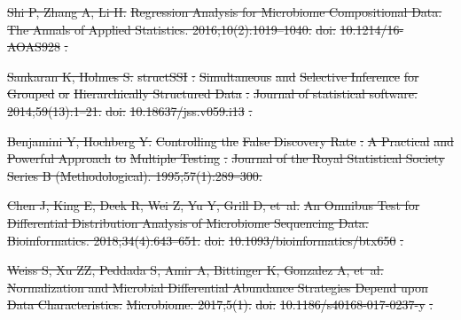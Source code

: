 \documentclass[10pt,letterpaper]{article}
\providecommand{\DIFdeltex}[1]{{\protect\color{red}\sout{#1}}}                      %
\providecommand{\DIFdelbegin}{} %
\providecommand{\DIFdel}[1]{\texorpdfstring{\DIFdeltex{#1}}{}} %
\newcommand{\DIFscaledelfig}{0.5}
\newlength{\DIFdelgraphicswidth} %
\newlength{\DIFdelgraphicsheight} %
\newcommand{\DIFdelincludegraphics}[2][]{%
\sbox{\DIFdelgraphicsbox}{\DIFOincludegraphics[#1]{#2}}%
\settoboxwidth{\DIFdelgraphicswidth}{\DIFdelgraphicsbox} %
\settoboxtotalheight{\DIFdelgraphicsheight}{\DIFdelgraphicsbox} %
\scalebox{\DIFscaledelfig}{%
\parbox[b]{\DIFdelgraphicswidth}{\usebox{\DIFdelgraphicsbox}\\[-\baselineskip] \rule{\DIFdelgraphicswidth}{0em}}\llap{\resizebox{\DIFdelgraphicswidth}{\DIFdelgraphicsheight}{%
\setlength{\unitlength}{\DIFdelgraphicswidth}%
\begin{picture}(1,1)%
\thicklines\linethickness{2pt} %
{\color[rgb]{1,0,0}\put(0,0){\framebox(1,1){}}}%
{\color[rgb]{1,0,0}\put(0,0){\line( 1,1){1}}}%
{\color[rgb]{1,0,0}\put(0,1){\line(1,-1){1}}}%
\end{picture}%
}\hspace*{3pt}}} %
} %
\DeclareRobustCommand{\DIFdelbegin}{\DIFOdelbegin \let\includegraphics\DIFdelincludegraphics} %
\begin{document}
\begin{thebibliography}{10}
\DIFdelbegin {}
\DIFdel{Shi P, Zhang A, Li H.
}%
\DIFdel{Regression Analysis for Microbiome Compositional Data.
}%
\DIFdel{The Annals of Applied Statistics. 2016;10(2):1019--1040.
}%
\DIFdel{doi:}%
\DIFdel{10.1214/16-AOAS928}%
\DIFdel{.
}%

\DIFdel{Sankaran K, Holmes S.
}%
\DIFdel{structSSI}%
\DIFdel{: }%
\DIFdel{Simultaneous}%
\DIFdel{and }%
\DIFdel{Selective Inference}%
\DIFdel{for
  }%
\DIFdel{Grouped}%
\DIFdel{or }%
\DIFdel{Hierarchically Structured Data}%
\DIFdel{.
}%
\DIFdel{Journal of statistical software. 2014;59(13):1--21.
}%
\DIFdel{doi:}%
\DIFdel{10.18637/jss.v059.i13}%
\DIFdel{.
}%

\DIFdel{Benjamini Y, Hochberg Y.
}%
\DIFdel{Controlling the }%
\DIFdel{False Discovery Rate}%
\DIFdel{: }%
\DIFdel{A Practical}%
\DIFdel{and
  }%
\DIFdel{Powerful Approach}%
\DIFdel{to }%
\DIFdel{Multiple Testing}%
\DIFdel{.
}%
\DIFdel{Journal of the Royal Statistical Society Series B (Methodological).
  1995;57(1):289--300.
}%

\DIFdel{Chen J, King E, Deek R, Wei Z, Yu Y, Grill D, et~al.
}%
\DIFdel{An Omnibus Test for Differential Distribution Analysis of Microbiome
  Sequencing Data.
}%
\DIFdel{Bioinformatics. 2018;34(4):643--651.
}%
\DIFdel{doi:}%
\DIFdel{10.1093/bioinformatics/btx650}%
\DIFdel{.
}%

\DIFdel{Weiss S, Xu ZZ, Peddada S, Amir A, Bittinger K, Gonzalez A, et~al.
}%
\DIFdel{Normalization and Microbial Differential Abundance Strategies Depend
  upon Data Characteristics.
}%
\DIFdel{Microbiome. 2017;5(1).
}%
\DIFdel{doi:}%
\DIFdel{10.1186/s40168-017-0237-y}%
\DIFdel{.
}%


\end{thebibliography}
\end{document}
